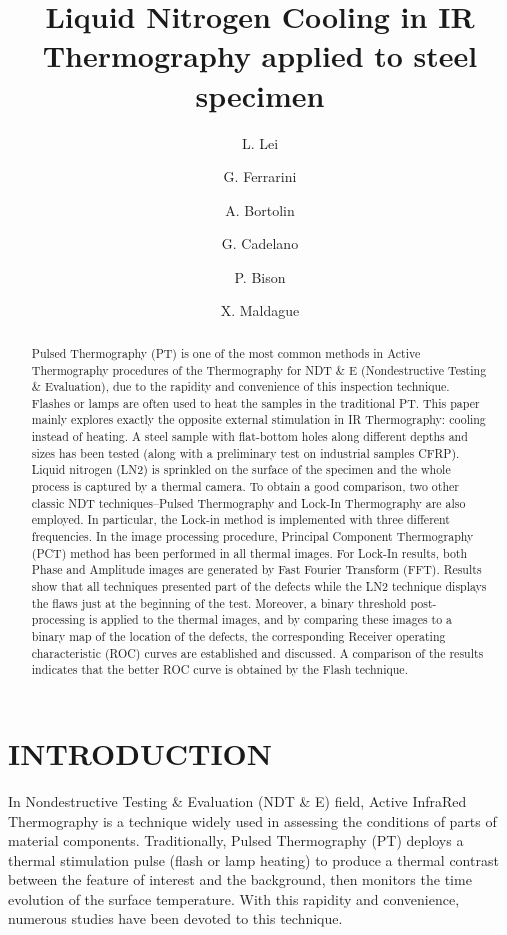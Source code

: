 \documentclass[]{spie}  %
\title{Liquid Nitrogen Cooling in IR Thermography applied to steel specimen}
\author[a]{L. Lei}
\author[b]{G. Ferrarini}
\author[b]{A. Bortolin}
\author[b]{G. Cadelano}
\author[b]{P. Bison}
\author[a]{X. Maldague}
\affil[a]{LVSN, University Laval, 1065 avenue de la Médecine, Québec (Québec) G1V 0A6 Canada}
\affil[b]{CNR-ITC, Corso Stati Uniti 4, 35127 Padova PD, Italy}
\begin{document}
 
\maketitle

\begin{abstract}
Pulsed Thermography (PT) is one of the most common methods in Active Thermography procedures of the Thermography for NDT \& E (Nondestructive Testing \& Evaluation), due to the rapidity and convenience of this inspection technique. Flashes or lamps are often used to heat the samples in the traditional PT. This paper mainly explores exactly the opposite external stimulation in IR Thermography: cooling instead of heating. A steel sample with flat-bottom holes along different depths and sizes has been tested (along with a preliminary test on industrial samples CFRP). Liquid nitrogen (LN2) is sprinkled on the surface of the specimen and the whole process is captured by a thermal camera. To obtain a good comparison, two other classic NDT techniques--Pulsed Thermography and Lock-In Thermography are also employed. In particular, the  Lock-in  method  is  implemented  with  three  different  frequencies.  In  the  image  processing  procedure,  Principal Component Thermography (PCT) method has been performed in all thermal images. For Lock-In results, both Phase and Amplitude images are generated by Fast Fourier Transform (FFT). Results show that all techniques presented part of the defects while the LN2 technique displays the flaws just at the beginning of the test. Moreover, a binary threshold post-processing is applied to the thermal images, and by comparing these images to a binary map of the location of the defects, the corresponding Receiver operating characteristic (ROC) curves are established and discussed. A comparison of the results indicates that the better ROC curve is obtained by the Flash technique.   
\end{abstract}


\section{INTRODUCTION}
\label{sec:introduction}  %
In Nondestructive Testing \& Evaluation (NDT \& E) field, Active InfraRed Thermography is a technique widely used in assessing the conditions of parts of material components\cite{Maldague2001theory}. Traditionally, Pulsed Thermography (PT) deploys a thermal stimulation pulse (flash or lamp heating) to produce a thermal contrast between the feature of interest and the background, then monitors the time evolution of the surface temperature. With this rapidity and convenience, numerous studies have been devoted to this technique\cite{Maldague1993Nondestructive,Maldague1994bInfra,2011-ClementeIbarra-Castanedo,2007-Ibarra-Castanedo,duan2013quantitative}.
\end{document}
